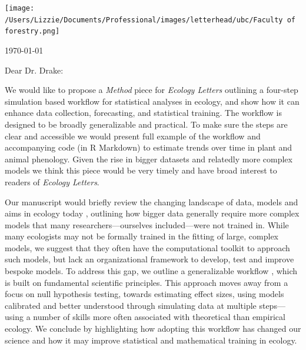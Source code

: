 \documentclass[11pt]{article}
\begin{document}

\renewcommand{\refname}{\CHead{}}

\hspace{-5ex} \texttt{[image: /Users/Lizzie/Documents/Professional/images/letterhead/ubc/Faculty of forestry.png]}
\vspace{1.5ex}\\

\setlength{\parindent}{0pt}
\setlength{\parskip}{7pt}

\today

Dear Dr. Drake:

We would like to propose a \emph{Method} piece for \emph{Ecology Letters} outlining a four-step simulation based workflow for statistical analyses in ecology, and show how it can enhance data collection, forecasting, and statistical training. The workflow is designed to be broadly generalizable and practical. To make sure the steps are clear and accessible we would present full example of the workflow and accompanying code (in R Markdown) to estimate trends over time in plant and animal phenology. Given the rise in bigger datasets and relatedly more complex models we think this piece would be very timely and have broad interest to readers of \emph{Ecology Letters}.


Our manuscript would briefly review the changing landscape of data, models and aims in ecology today \citep{anderson2021trends,muff2022rewriting}, outlining how bigger data generally require more complex models that many researchers---ourselves included---were not trained in. While many ecologists may not be formally trained in the fitting of large, complex models, we suggest that they often have the computational toolkit to approach such models, but lack an organizational framework to develop, test and improve bespoke models. To address this gap, we outline a generalizable workflow \citep[see Fig. \ref{fig:workflow} below, and see][]{grinsztajn2021,vandeschoot2021}, which is built on fundamental scientific principles. This approach  moves away from a focus on null hypothesis testing, towards estimating effect sizes, using models calibrated and better understood through simulating data at multiple steps---using a number of skills more often associated with theoretical than empirical ecology. We conclude by highlighting how adopting this workflow has changed our science and how it may improve statistical and mathematical training in ecology. 
\end{document}

